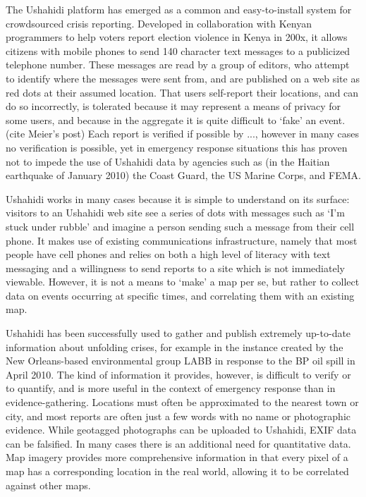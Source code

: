 \documentclass[11pt,oneside,notitlepage]{report}
\begin{document}
The Ushahidi platform has emerged as a common and easy-to-install system for crowdsourced crisis reporting. Developed in collaboration with Kenyan programmers to help voters report election violence in Kenya in 200x, it allows citizens with mobile phones to send 140 character text messages to a publicized telephone number. \cite{okolloh2009ushahidi} These messages are read by a group of editors, who attempt to identify where the messages were sent from, and are published on a web site as red dots at their assumed location. That users self-report their locations, and can do so incorrectly, is tolerated because it may represent a means of privacy for some users, and because in the aggregate it is quite difficult to `fake' an event. (cite Meier's post) Each report is verified if possible by ..., however in many cases no verification is possible, yet in emergency response situations this has proven not to impede the use of Ushahidi data by agencies such as (in the Haitian earthquake of January 2010) the Coast Guard, the US Marine Corps, and FEMA. \cite{meier2010crowdsorcerors}\cite{meier2010ushahidi} 


Ushahidi works in many cases because it is simple to understand on its surface: visitors to an Ushahidi web site see a series of dots with messages such as `I'm stuck under rubble' and imagine a person sending such a message from their cell phone. It makes use of existing communications infrastructure, namely that most people have cell phones and relies on both a high level of literacy with text messaging and a willingness to send reports to a site which is not immediately viewable. However, it is not a means to `make' a map per se, but rather to collect data on events occurring at specific times, and correlating them with an existing map.

Ushahidi has been successfully used to gather and publish extremely up-to-date information about unfolding crises, for example in the instance created by the New Orleans-based environmental group \ac{LABB} in response to the BP oil spill in April 2010. The kind of information it provides, however, is difficult to verify or to quantify, and is more useful in the context of emergency response than in evidence-gathering. \cite{meier2010verification} Locations must often be approximated to the nearest town or city, and most reports are often just a few words with no name or photographic evidence. While geotagged photographs can be uploaded to Ushahidi, EXIF data can be falsified. In many cases there is an additional need for quantitative data. Map imagery provides more comprehensive information in that every pixel of a map has a corresponding location in the real world, allowing it to be correlated against other maps. 
\end{document}
